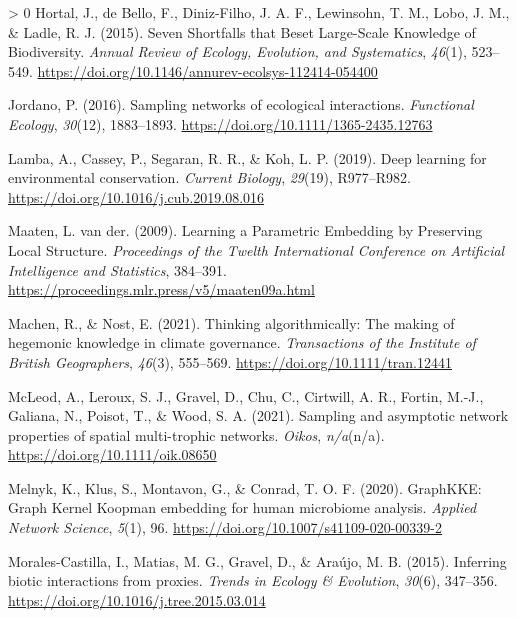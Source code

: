 \documentclass[10pt,oneside]{article}
\newlength{\cslhangindent}
\newenvironment{CSLReferences}[3] %
 {%
  \setlength{\parindent}{0pt}
  \ifodd #1 \everypar{\setlength{\hangindent}{\cslhangindent}}\ignorespaces\fi
  \ifnum #2 > 0
  \setlength{\parskip}{#2\baselineskip}
  \fi
 }%
 {}
\begin{document}
\begin{CSLReferences}{1}{0}
\leavevmode\hypertarget{ref-Hortal2015SevSho}{}%
Hortal, J., de Bello, F., Diniz-Filho, J. A. F., Lewinsohn, T. M., Lobo,
J. M., \& Ladle, R. J. (2015). Seven Shortfalls that Beset Large-Scale
Knowledge of Biodiversity. \emph{Annual Review of Ecology, Evolution,
and Systematics}, \emph{46}(1), 523--549.
\url{https://doi.org/10.1146/annurev-ecolsys-112414-054400}

\leavevmode\hypertarget{ref-Jordano2016SamNet}{}%
Jordano, P. (2016). Sampling networks of ecological interactions.
\emph{Functional Ecology}, \emph{30}(12), 1883--1893.
\url{https://doi.org/10.1111/1365-2435.12763}

\leavevmode\hypertarget{ref-Lamba2019DeeLea}{}%
Lamba, A., Cassey, P., Segaran, R. R., \& Koh, L. P. (2019). Deep
learning for environmental conservation. \emph{Current Biology},
\emph{29}(19), R977--R982.
\url{https://doi.org/10.1016/j.cub.2019.08.016}

\leavevmode\hypertarget{ref-Maaten2009LeaPar}{}%
Maaten, L. van der. (2009). Learning a Parametric Embedding by
Preserving Local Structure. \emph{Proceedings of the Twelth
International Conference on Artificial Intelligence and Statistics},
384--391. \url{https://proceedings.mlr.press/v5/maaten09a.html}

\leavevmode\hypertarget{ref-Machen2021ThiAlg}{}%
Machen, R., \& Nost, E. (2021). Thinking algorithmically: The making of
hegemonic knowledge in climate governance. \emph{Transactions of the
Institute of British Geographers}, \emph{46}(3), 555--569.
\url{https://doi.org/10.1111/tran.12441}

\leavevmode\hypertarget{ref-McLeod2021SamAsy}{}%
McLeod, A., Leroux, S. J., Gravel, D., Chu, C., Cirtwill, A. R., Fortin,
M.-J., Galiana, N., Poisot, T., \& Wood, S. A. (2021). Sampling and
asymptotic network properties of spatial multi-trophic networks.
\emph{Oikos}, \emph{n/a}(n/a). \url{https://doi.org/10.1111/oik.08650}

\leavevmode\hypertarget{ref-Melnyk2020GraGra}{}%
Melnyk, K., Klus, S., Montavon, G., \& Conrad, T. O. F. (2020).
GraphKKE: Graph Kernel Koopman embedding for human microbiome analysis.
\emph{Applied Network Science}, \emph{5}(1), 96.
\url{https://doi.org/10.1007/s41109-020-00339-2}

\leavevmode\hypertarget{ref-Morales-Castilla2015InfBio}{}%
Morales-Castilla, I., Matias, M. G., Gravel, D., \& Araújo, M. B.
(2015). Inferring biotic interactions from proxies. \emph{Trends in
Ecology \& Evolution}, \emph{30}(6), 347--356.
\url{https://doi.org/10.1016/j.tree.2015.03.014}


\end{CSLReferences}
\end{document}
